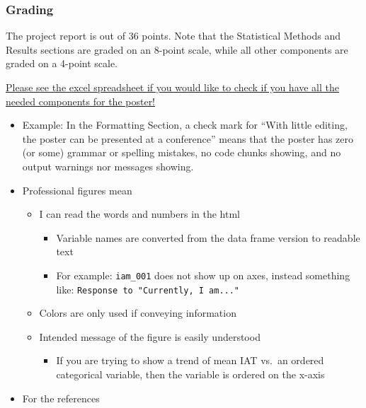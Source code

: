 \documentclass[
  letterpaper,
  DIV=11,
  numbers=noendperiod]{scrartcl}
\providecommand{\tightlist}{%
  \setlength{\itemsep}{0pt}\setlength{\parskip}{0pt}}
\begin{document}
\subsubsection{Grading}\label{grading}

The project report is out of 36 points. Note that the Statistical
Methods and Results sections are graded on an 8-point scale, while all
other components are graded on a 4-point scale.

\href{https://ohsuitg-my.sharepoint.com/:x:/r/personal/wakim_ohsu_edu/Documents/Teaching/Classes/BSTA_513_26S/Student_files_BSTA_513/Project/Resources/Project_Rubric_513_613_26S.xlsx?d=w5ebea0e980ee4149a3897e923c866a0d&csf=1&web=1&e=CGg89t}{Please
see the excel spreadsheet if you would like to check if you have all the
needed components for the poster!}

\begin{itemize}
\tightlist
\item
  Example: In the Formatting Section, a check mark for ``With little
  editing, the poster can be presented at a conference'' means that the
  poster has zero (or some) grammar or spelling mistakes, no code chunks
  showing, and no output warnings nor messages showing.
\item
  Professional figures mean

  \begin{itemize}
  \tightlist
  \item
    I can read the words and numbers in the html

    \begin{itemize}
    \tightlist
    \item
      Variable names are converted from the data frame version to
      readable text
    \item
      For example: \texttt{iam\_001} does not show up on axes, instead
      something like: \texttt{Response\ to\ "Currently,\ I\ am..."}
    \end{itemize}
  \item
    Colors are only used if conveying information
  \item
    Intended message of the figure is easily understood

    \begin{itemize}
    \tightlist
    \item
      If you are trying to show a trend of mean IAT vs.~an ordered
      categorical variable, then the variable is ordered on the x-axis
    \end{itemize}
  \end{itemize}
\item
  For the references


\end{itemize}
\end{document}
